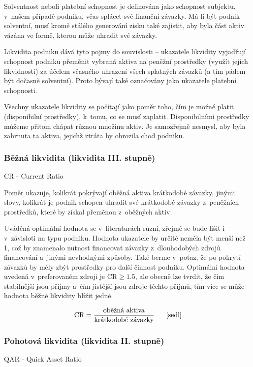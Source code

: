 Solventnost neboli platební schopnost je definována jako schopnost subjektu, v~našem případě podniku, včas splácet své finanční závazky. Má-li být podnik solventní, musí kromě stálého generování zisku také zajistit, aby byla část aktiv vázána ve formě, kterou může uhradit své závazky.

Likvidita podniku dává tyto pojmy do souvislosti -- ukazatele likvidity vyjadřují schopnost podniku přeměnit vybraná aktiva na peněžní prostředky (využít jejich likvidnosti) za účelem včasného uhrazení všech splatných závazků (a tím pádem být dočasně solventní)\cite{schol}. Proto bývají také označovány jako ukazatele platební schopnosti.

Všechny ukazatele likvidity se počítají jako poměr toho, čím je možné platit (disponibilní prostředky), k~tomu, co se musí zaplatit. Disponibilními prostředky můžeme přitom chápat různou množinu aktiv. Je samozřejmě nesmysl, aby byla zahrnuta ta aktiva, jejichž ztráta by ohrozila chod podniku.

\pagebreak
\subsubsection{Běžná likvidita (likvidita III. stupně)} 
CR - Current Ratio

Poměr ukazuje, kolikrát pokrývají oběžná aktiva krátkodobé závazky, jinými slovy, kolikrát je podnik schopen uhradit své krátkodobé závazky z~peněžních prostředků, které by získal přeměnou z~oběžných aktiv.

Uváděná optimální hodnota se v~literaturách různí, zřejmě se bude lišit i v~závisloti na typu podniku. Hodnota ukazatele by určitě neměla být menší než 1, což by znamenalo nutnost financovat závazky z~dlouhodobých zdrojů financování a~jinými nevhodnými způsoby. Také berme v~potaz, že po pokrytí závazků by měly zbýt prostředky pro další činnost podniku.
Optimální hodnota uvedená v~preferovaném zdroji je CR$\geq 1.5$, ale obecně lze tvrdit, že čím stabilnější jsou příjmy a~čím jistější jsou zdroje těchto příjmů, tím více se může hodnota běžné likvidity blížit jedné\cite{businessvize_bez_likv}.

$$\vz{CR}{oběžná aktiva}{krátkodobé závazky} \scite{sedl}$$

\subsubsection{Pohotová likvidita (likvidita II. stupně)} 
QAR - Quick Asset Ratio

